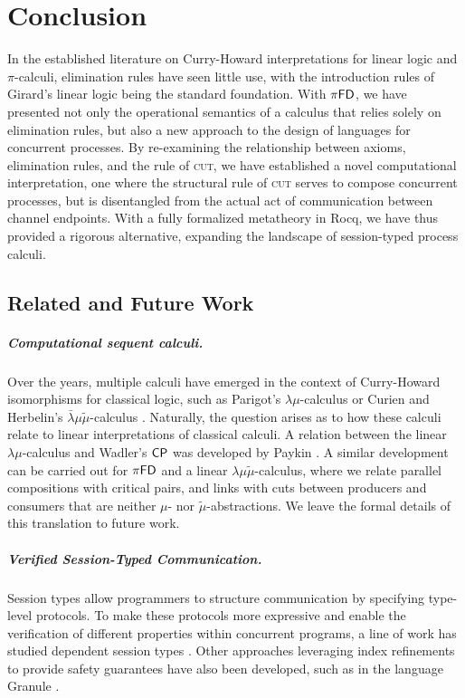 \chapter{Conclusion}\label{ch:conclusion}
In the established literature on Curry-Howard interpretations for linear logic and
$\pi$-calculi, elimination rules have seen little use, with the introduction
rules of Girard's linear logic being the standard foundation.
With $\pi\textsf{FD}$, we have presented not only the operational semantics of a calculus
that relies solely on elimination rules, but also a new approach to the design
of languages for concurrent processes. By re-examining the relationship between
axioms, elimination rules, and the rule of \textsc{cut}, we have established
a novel computational interpretation, one where the structural rule
of \textsc{cut} serves to compose concurrent processes, but is disentangled
from the actual act of communication between channel endpoints.
With a fully formalized metatheory in Rocq,
we have thus provided a rigorous alternative, expanding the landscape
of session-typed process calculi.

\section{Related and Future Work}
\paragraph{Computational sequent calculi.}
Over the years, multiple calculi have emerged in the context of
Curry-Howard isomorphisms for classical logic, such as
Parigot's $\lambda\mu$-calculus \cite{Parigot1992:lambda-mu} or
Curien and Herbelin's $\bar{\lambda}\mu\tilde{\mu}$-calculus \cite{Curien2000:DualityOfComputation}.
Naturally, the question arises as to how these calculi relate to
linear interpretations of classical calculi. A relation between the
linear $\lambda\mu$-calculus and Wadler's $\textsf{CP}$ was developed by Paykin \cite{Paykin2016:lambda-mu-is-cp}.
A similar development can be carried out for $\pi\textsf{FD}$ and a linear $\lambda\mu\tilde{\mu}$-calculus, where we
relate parallel compositions with critical pairs, and links with cuts between
producers and consumers that are neither $\mu$- nor $\tilde{\mu}$-abstractions.
We leave the formal details of this translation to future work.

\paragraph{Verified Session-Typed Communication.}
Session types allow programmers to structure communication by specifying
type-level protocols. To make these protocols more expressive and enable
the verification of different properties within concurrent programs,
a line of work has studied dependent session types
\cite{Pfennig2011:ProofCarryingCodeInSessionCalculi, Toninho2011:DependentSessionTypesIntuitionisticTypeTheory}.
Other approaches leveraging index refinements to provide safety guarantees
have also been developed, such as in the language Granule \cite{Orchard2019:granule}.

